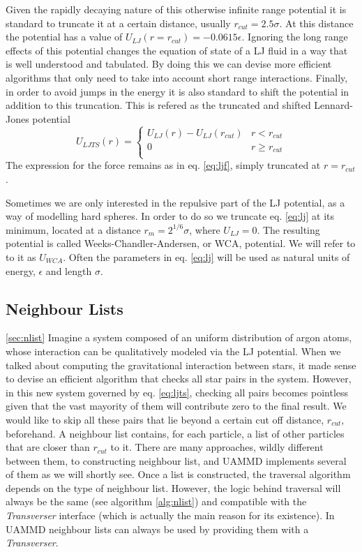 \documentclass[ twoside,openright,titlepage,numbers=noenddot,%
headinclude,footinclude,cleardoublepage=empty,abstract=on,
BCOR=5mm,paper=a4,fontsize=11pt, dvipsnames
]{scrreprt}
\newcommand{\uammd}{\gls{UAMMD}\xspace}
\begin{document}
Given the rapidly decaying nature of this otherwise infinite range potential it is standard to truncate it at a certain distance, usually $r_{cut} = 2.5\sigma$. At this distance the potential has a value of $U_{LJ}(r = r_{cut}) = -0.0615\epsilon$.
Ignoring the long range effects of this potential changes the equation of state of a \gls{LJ} fluid in a way that is well understood and tabulated\cite{ljtrunc}. By doing this we can devise more efficient algorithms that only need to take into account short range interactions.
Finally, in order to avoid jumps in the energy it is also standard to shift the potential in addition to this truncation. This is refered as the truncated and shifted Lennard-Jones potential
\begin{equation}
  \label{eq:ljts}
  U_{LJTS}(r) =
  \begin{cases}
      U_{LJ}(r) - U_{LJ}(r_{cut}) & r<r_{cut}\\
      0 & r\ge r_{cut}\\                                    
    \end{cases}
\end{equation}
The expression for the force remains as in eq. \eqref{eq:ljf}, simply truncated at $r=r_{cut}$.

Sometimes we are only interested in the repulsive part of the LJ potential, as a way of modelling hard spheres. In order to do so we truncate eq. \eqref{eq:lj} at its minimum, located at a distance $r_m = 2^{1/6}\sigma$, where $U_{LJ} = 0$. The resulting potential is called Weeks-Chandler-Andersen, or WCA, potential. We will refer to to it as $U_{WCA}$.
Often the parameters in eq. \eqref{eq:lj} will be used as natural units of energy, $\epsilon$ and length $\sigma$.
\subsection{Neighbour Lists}\ref{sec:nlist}
Imagine a system composed of an uniform distribution of argon atoms, whose interaction can be qualitatively modeled via the \gls{LJ} potential. When we talked about computing the gravitational interaction between stars, it made sense to devise an efficient algorithm that checks all star pairs in the system. However, in this new system governed by eq. \eqref{eq:ljts}, checking all pairs becomes pointless given that the vast mayority of them will contribute zero to the final result. We would like to skip all these pairs that lie beyond a certain cut off distance, $r_{cut}$, beforehand. A neighbour list contains, for each particle, a list of other particles that are closer than $r_{cut}$ to it. There are many approaches, wildly different between them, to constructing neighbour list, and \uammd implements several of them as we will shortly see.
Once a list is constructed, the traversal algorithm depends on the type of neighbour list. However, the logic behind traversal will always be the same (see algorithm \ref{alg:nlist}) and compatible with the \emph{Transverser} interface (which is actually the main reason for its existence). In \uammd neighbour lists can always be used by providing them with a \emph{Transverser}.
\end{document}
